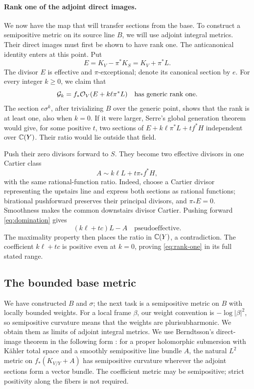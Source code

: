 \paragraph{Rank one of the adjoint direct images.}
We now have the map that will transfer sections from the base. To
construct a semipositive metric on its source line \(B\), we will
use adjoint integral metrics. Their direct images must first be shown
to have rank one. The anticanonical identity enters at this point. Put
\begin{equation}\label{eq:discrepancy}
E=K_V-\pi^*K_S=K_V+\pi^*L.
\end{equation}
The divisor \(E\) is effective and \(\pi\)-exceptional; denote its
canonical section by \(e\). For every integer \(k\ge0\), we claim
that
\begin{equation}\label{eq:rank-one}
\mathcal G_k=f_*\mathcal O_V(E+k\ell\pi^*L)
\quad\text{has generic rank one.}
\end{equation}
The section \(e\sigma^k\), after trivializing \(B\) over the
generic point, shows that the rank is at least one, also when \(k=0\).
If it were larger, Serre's global generation theorem would give, for
some positive \(t\), two sections of
\(E+k\ell\pi^*L+tf^*H\) independent over \(\mathbb C(Y)\). Their ratio
would lie outside that field.

Push their zero divisors forward to \(S\). They become two effective
divisors in one Cartier class
\[
A\sim k\ell L+t\pi_*f^*H,
\]
with the same rational-function ratio. Indeed, choose a Cartier divisor
representing the upstairs line and express both sections as rational
functions; birational pushforward preserves their principal divisors,
and \(\pi_*E=0\). Smoothness makes the common downstairs divisor
Cartier. Pushing forward \eqref{eq:domination} gives
\[
(k\ell+tc)L-A\quad\text{pseudoeffective}.
\]
The maximality property then places the ratio in \(\mathbb C(Y)\), a
contradiction. The coefficient \(k\ell+tc\) is positive even at
\(k=0\), proving \eqref{eq:rank-one} in its full stated range.

\subsection{The bounded base metric}

We have constructed \(B\) and \(\sigma\); the next task is a
semipositive metric on \(B\) with locally bounded weights. For a local
frame \(\beta\), our weight convention is \(-\log|\beta|^2\),
so semipositive curvature means that the weights are plurisubharmonic.
We obtain them as limits of adjoint integral metrics. We use
Berndtsson's direct-image theorem in the following
form \cite[Theorem~1.2]{Berndtsson2009}: for a proper holomorphic
submersion with K\"ahler total space and a smoothly semipositive line
bundle \(A\), the natural \(L^2\) metric on
\(f_*(K_{V/Y}+A)\) has semipositive curvature wherever the adjoint
sections form a vector bundle. The coefficient metric may be
semipositive; strict positivity along the fibers is not required.

